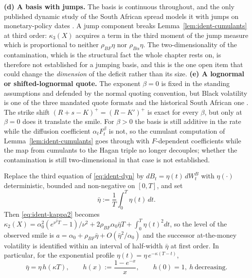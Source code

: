 \documentclass[../../../main.tex]{subfiles}
\begin{document}
{\textbf{(d) A basis with jumps.} The basis is continuous throughout, and the only published dynamic study of the South African spread models it with jumps on monetary-policy dates \citep[Abstract]{alfeus2026}. A jump component breaks Lemma~\ref{lem:ident-cumulants} at third order: $\kappa_3(X)$ acquires a term in the third moment of the jump measure which is proportional to neither $\rho_{BF}\eta$ nor $\rho_{B\alpha}\eta$. The two-dimensionality of the contamination, which is the structural fact the whole chapter rests on, is therefore not established for a jumping basis, and this is the one open item that could change the \emph{dimension} of the deficit rather than its size.
\textbf{(e) A lognormal or shifted-lognormal quote.} The exponent $\beta=0$ is fixed in the standing assumptions and defended by the normal quoting convention, but Black volatility is one of the three mandated quote formats and the historical South African one \citep[\S8, p.~26]{sarb2024conv}. The strike shift $(R+s-K)^+=(R-K')^+$ is exact for every $\beta$, but only at $\beta=0$ does it translate the smile. For $\beta>0$ the basis is still additive in the rate while the diffusion coefficient $\alpha_tF_t^\beta$ is not, so the cumulant computation of Lemma~\ref{lem:ident-cumulants} goes through with $F$-dependent coefficients while the map from cumulants to the Hagan triple no longer decouples; whether the contamination is still two-dimensional in that case is not established.}

\begin{proposition}\label{prop:ident-termstructure}
Replace the third equation of \eqref{eq:ident-dyn} by $dB_t=\eta(t)\,dW^B_t$ with $\eta(\cdot)$ deterministic, bounded and non-negative on $[0,T]$, and set
\[
\bar\eta:=\frac1T\int_0^T\eta(t)\,dt .
\]
Then \eqref{eq:ident-kappa2} becomes $\kappa_2(X)=\alpha_0^2(e^{\nu^2T}-1)/\nu^2+2\rho_{BF}\alpha_0\bar\eta T+\int_0^T\eta(t)^2dt$, so the level of the observed smile is $a=\alpha_0+\rho_{BF}\bar\eta+O(\bar\eta^2/\alpha_0)$ and the successor at-the-money volatility is identified within an interval of half-width $\bar\eta$ at first order. In particular, for the exponential profile $\eta(t)=\eta\,e^{-\kappa(T-t)}$,
\begin{equation}\label{eq:ident-h}
\bar\eta=\eta\,h(\kappa T),\qquad h(x):=\frac{1-e^{-x}}{x},\qquad h(0)=1,\ h\ \text{decreasing}.
\end{equation}
\end{proposition}
\end{document}
